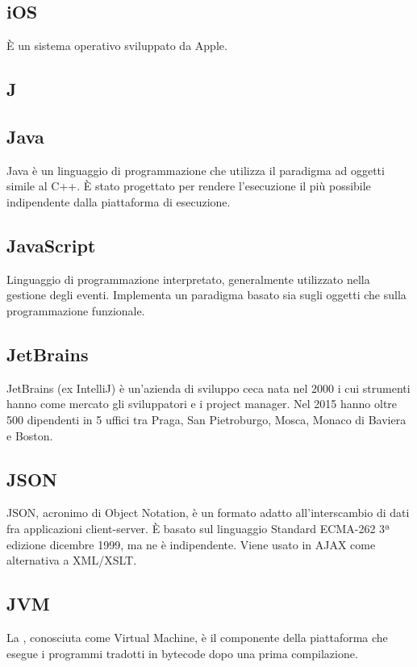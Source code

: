 \subsection{iOS}
È un sistema operativo sviluppato da Apple.

\newpage

\begin{center}
\Huge\section{\uppercase{J}}
\end{center}

\subsection{Java}
Java è un linguaggio di programmazione che utilizza il paradigma ad oggetti simile al C++. È stato
progettato per rendere l'esecuzione il più possibile indipendente dalla piattaforma di
esecuzione.

\subsection{JavaScript}
Linguaggio di programmazione interpretato, generalmente utilizzato nella gestione
degli eventi. Implementa un paradigma basato sia sugli oggetti che sulla programmazione
funzionale.

\subsection{JetBrains}
JetBrains (ex IntelliJ) è un'azienda di sviluppo  ceca nata nel 2000 i cui strumenti hanno come mercato gli sviluppatori  e i project manager. Nel 2015 hanno oltre 500 dipendenti in 5 uffici tra Praga, San Pietroburgo, Mosca, Monaco di Baviera e Boston.

\subsection{JSON}
JSON, acronimo di  Object Notation, è un formato adatto all'interscambio di dati fra applicazioni client-server. È basato sul linguaggio  Standard ECMA-262 3ª edizione dicembre 1999, ma ne è indipendente. Viene usato in AJAX come alternativa a XML/XSLT.

\subsection{JVM}
La , conosciuta come  Virtual Machine, è il componente della piattaforma  che esegue i programmi tradotti in bytecode dopo una prima compilazione.

